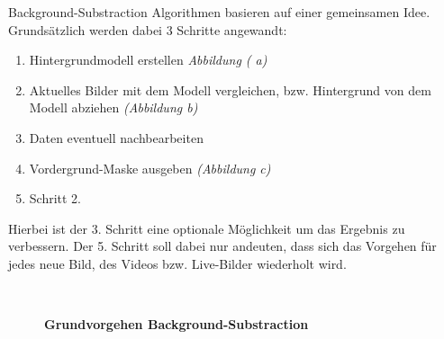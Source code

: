 Background-Substraction Algorithmen basieren auf einer gemeinsamen Idee.
Grundsätzlich werden dabei 3 Schritte angewandt:
\begin{enumerate}
\item Hintergrundmodell erstellen \textit{Abbildung ( a)}
\item Aktuelles Bilder mit dem Modell vergleichen, bzw. Hintergrund von dem Modell abziehen \textit{(Abbildung  b)}
\item Daten eventuell nachbearbeiten
\item Vordergrund-Maske ausgeben \textit{(Abbildung  c)}
\item Schritt 2.
\end{enumerate}
Hierbei ist der 3. Schritt eine optionale Möglichkeit um das Ergebnis zu verbessern. 
Der 5. Schritt soll dabei nur andeuten, dass sich das Vorgehen für jedes neue Bild, des Videos bzw. Live-Bilder wiederholt wird.
\begin{figure}[ht]
\qquad
{}\\
\begin{center}
\par\end{center}
\caption{\textbf{Grundvorgehen Background-Substraction}}
\label{Fig:background}
\end{figure}

